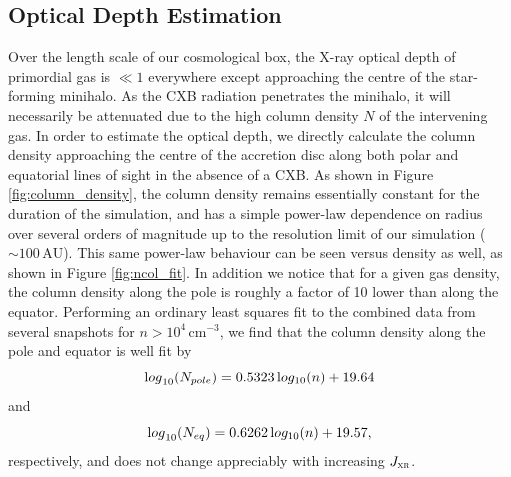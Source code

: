 \documentclass{thesis}
\newcommand{\cc}{\ensuremath{\,\mathrm{cm}^{-3}}\xspace}
\newcommand{\au}{\ensuremath{\,\mathrm{AU}}\xspace}
\newcommand{\jxr}{\ensuremath{J_{\textsc{xr}}}\xspace}
\begin{document}
\subsection{Optical Depth Estimation}
\label{attenuation}
Over the length scale of our cosmological box, the X-ray optical depth of primordial gas is $\ll 1$ everywhere except approaching the centre of the star-forming minihalo. As the CXB radiation penetrates the minihalo, it will necessarily be attenuated due to the high column density $N$ of the intervening gas.  In order to estimate the optical depth, we directly calculate the column density approaching the centre of the accretion disc along both polar and equatorial lines of sight in the absence of a CXB. As shown in Figure \ref{fig:column_density}, the column density remains essentially constant for the duration of the simulation, and has a simple power-law dependence on radius over several orders of magnitude up to the resolution limit of our simulation ($\sim100\au$). This same power-law behaviour can be seen versus density as well, as shown in Figure \ref{fig:ncol_fit}. In addition we notice that for a given gas density, the column density along the pole is roughly a factor of 10 lower than along the equator.  Performing an ordinary least squares fit to the combined data from several snapshots for $n > 10^4\cc$, we find that the column density along the pole and equator is well fit by 
\begin{equation}
{\mathrm log}_{10}(N_{\mathrm \small pole}) = 0.5323\, {\mathrm log_{10}}(n) + 19.64
\end{equation}
and
\begin{equation}
{\mathrm log}_{10}(N_{\mathrm \small eq}) = 0.6262\, {\mathrm log_{10}}(n) + 19.57, 
\end{equation}
respectively, and does not change appreciably with increasing \jxr.
\end{document}
